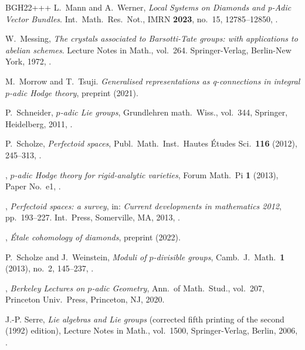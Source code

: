 \begin{thebibliography}{BGH{\etalchar{+}}22+++}
L.~Mann and  A.~Werner, 
{\em {L}ocal {S}ystems on {D}iamonds and p-{A}dic {V}ector {B}undles}.  Int.\ Math.\ Res.\ Not., IMRN \textbf{2023}, no.~15, 12785--12850, .

W.~Messing, 
{\em {T}he crystals associated to {B}arsotti-{T}ate groups: with applications to abelian schemes}.  Lecture Notes in Math., vol.~264. Springer-Verlag, Berlin-New York, 1972, .
	
M.~Morrow and T.~Tsuji.
{\em Generalised representations as q-connections in integral $p$-adic {H}odge theory}, preprint  (2021).
		
P.~Schneider, 
{\em {$p$}-adic {L}ie groups}, Grundlehren math.\ Wiss., vol.~344, Springer, Heidelberg, 2011, .
	
P.~Scholze, 
{\em {P}erfectoid spaces}, Publ.\ Math.\ Inst.\ Hautes \'{E}tudes Sci.\ \textbf{116} (2012), 245--313, .
	
\bysame, 
       {\em {$p$}-adic {H}odge theory for rigid-analytic varieties}, Forum Math.\ Pi \textbf{1} (2013), Paper No.~e1,  .
	
\bysame, 
{\em {P}erfectoid spaces: a survey}, in: {\em Current developments in mathematics 2012}, pp.~193--227.  Int.\ Press, Somerville, MA, 2013, .
	
\bysame, 
{\em {\'E}tale cohomology of diamonds}, preprint  (2022).

P.~Scholze and  J.~Weinstein, 
{\em {M}oduli of {$p$}-divisible groups}, Camb.\ J.~Math.\ \textbf{1} (2013), no.~2, 145--237, .
	
\bysame, 
{\em {B}erkeley {L}ectures on $p$-adic {G}eometry}, Ann.\ of Math.\ Stud., vol.~207, Princeton Univ.\ Press, Princeton, NJ, 2020.
       
J.-P. Serre, 
{\em Lie algebras and {L}ie groups} (corrected fifth printing of the second (1992) edition), Lecture Notes in Math., vol.~1500, Springer-Verlag, Berlin, 2006, .


\end{thebibliography}
